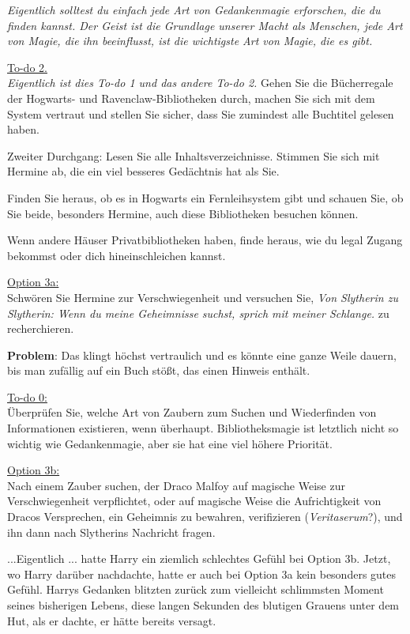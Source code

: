 \emph{Eigentlich solltest du einfach jede Art von Gedankenmagie erforschen, die
du finden kannst. Der Geist ist die Grundlage unserer Macht als Menschen, jede
Art von Magie, die ihn beeinflusst, ist die wichtigste Art von Magie, die es
gibt.}

\underline{To-do 2.}\\
\emph{Eigentlich ist dies To-do 1 und das andere To-do 2.} Gehen Sie die
Bücherregale der Hogwarts- und Ravenclaw-Bibliotheken durch, machen Sie sich mit
dem System vertraut und stellen Sie sicher, dass Sie zumindest alle Buchtitel
gelesen haben.

Zweiter Durchgang: Lesen Sie alle Inhaltsverzeichnisse. Stimmen Sie sich mit
Hermine ab, die ein viel besseres Gedächtnis hat als Sie.

Finden Sie heraus, ob es in Hogwarts ein Fernleihsystem gibt und schauen Sie, ob
Sie beide, besonders Hermine, auch diese Bibliotheken besuchen können.

Wenn andere Häuser Privatbibliotheken haben, finde heraus, wie du legal Zugang
bekommst oder dich hineinschleichen kannst.

\underline{Option 3a:}\\
Schwören Sie Hermine zur Verschwiegenheit und versuchen Sie, \glqq{}\emph{Von
Slytherin zu Slytherin: Wenn du meine Geheimnisse suchst, sprich mit meiner
Schlange.}\grqq{} zu recherchieren.

\textbf{Problem}: Das klingt höchst vertraulich und es könnte eine ganze Weile
dauern, bis man zufällig auf ein Buch stößt, das einen Hinweis enthält.

\underline{To-do 0:}\\
Überprüfen Sie, welche Art von Zaubern zum Suchen und Wiederfinden von
Informationen existieren, wenn überhaupt. Bibliotheksmagie ist letztlich nicht
so wichtig wie Gedankenmagie, aber sie hat eine viel höhere Priorität.

\underline{Option 3b:}\\
Nach einem Zauber suchen, der Draco Malfoy auf magische Weise zur
Verschwiegenheit verpflichtet, oder auf magische Weise die Aufrichtigkeit von
Dracos Versprechen, ein Geheimnis zu bewahren, verifizieren
(\emph{Veritaserum}?), und ihn dann nach Slytherins Nachricht fragen.

...Eigentlich ... hatte Harry ein ziemlich schlechtes Gefühl bei Option 3b.
Jetzt, wo Harry darüber nachdachte, hatte er auch bei Option 3a kein besonders
gutes Gefühl. Harrys Gedanken blitzten zurück zum vielleicht schlimmsten Moment
seines bisherigen Lebens, diese langen Sekunden des blutigen Grauens unter dem
Hut, als er dachte, er hätte bereits versagt.

